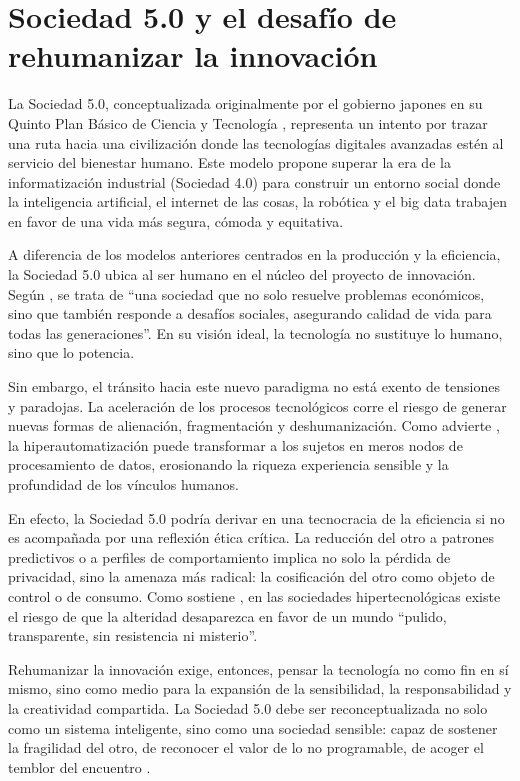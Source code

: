 \documentclass[spanish]{textolivre}
\begin{document}
\section{Sociedad 5.0 y el desafío de rehumanizar la innovación}\label{sec-normas}
La Sociedad 5.0, conceptualizada originalmente por el gobierno japones en su Quinto Plan Básico de Ciencia y Tecnología \cite{society5_0_2017}, representa un intento por trazar una ruta hacia una civilización donde las tecnologías digitales avanzadas estén al servicio del bienestar humano. Este modelo propone superar la era de la informatización industrial (Sociedad 4.0) para construir un entorno social donde la inteligencia artificial, el internet de las cosas, la robótica y el big data trabajen en favor de una vida más segura, cómoda y equitativa.

A diferencia de los modelos anteriores centrados en la producción y la eficiencia, la Sociedad 5.0 ubica al ser humano en el núcleo del proyecto de innovación. Según \textcite[p. 4]{kudo2019}, se trata de “una sociedad que no solo resuelve problemas económicos, sino que también responde a desafíos sociales, asegurando calidad de vida para todas las generaciones”. En su visión ideal, la tecnología no sustituye lo humano, sino que lo potencia.

Sin embargo, el tránsito hacia este nuevo paradigma no está exento de tensiones y paradojas. La aceleración de los procesos tecnológicos corre el riesgo de generar nuevas formas de alienación, fragmentación y deshumanización. Como advierte \textcite{floridi2019}, la hiperautomatización puede transformar a los sujetos en meros nodos de procesamiento de datos, erosionando la riqueza experiencia sensible y la profundidad de los vínculos humanos. 

En efecto, la Sociedad 5.0 podría derivar en una tecnocracia de la eficiencia si no es acompañada por una reflexión ética crítica. La reducción del otro a patrones predictivos o a perfiles de comportamiento implica no solo la pérdida de privacidad, sino la amenaza más radical: la cosificación del otro como objeto de control o de consumo. Como sostiene \textcite[p. 14]{han2012}, en las sociedades hipertecnológicas existe el riesgo de que la alteridad desaparezca en favor de un mundo “pulido, transparente, sin resistencia ni misterio”.

Rehumanizar la innovación exige, entonces, pensar la tecnología no como fin en sí mismo, sino como medio para la expansión de la sensibilidad, la responsabilidad y la creatividad compartida. La Sociedad 5.0 debe ser reconceptualizada no solo como un sistema inteligente, sino como una sociedad sensible: capaz de sostener la fragilidad del otro, de reconocer el valor de lo no programable, de acoger el temblor del encuentro \cite{seguelotondo2024}.
\end{document}
